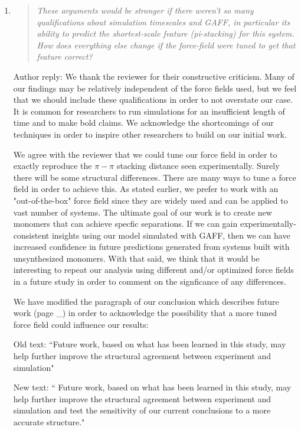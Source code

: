 \documentclass{article}
\begin{document}
\begin{enumerate}
    \item \begin{quote}
    \textit{These arguments would be stronger if there weren't so many
	    qualifications about simulation timescales and GAFF, in particular its ability
	    to predict the shortest-scale feature (pi-stacking) for this system. How does
	    everything else change if the force-field were tuned to get that feature
	    correct?}
    \end{quote}

    Author reply: We thank the reviewer for their constructive criticism. Many
    of our findings may be relatively independent of the force fields used, but we
    feel that we should include these qualifications in order to not overstate our
    case. It is common for researchers to run simulations for an insufficient
    length of time and to make bold claims. We acknowledge the shortcomings of our
    techniques in order to inspire other researchers to build on our initial work. 

    We agree with the reviewer that we could tune our force field in order to
    exactly reproduce the $\pi-\pi$ stacking distance seen experimentally. Surely
    there will be some structural differences. There are many ways to tune a force
    field in order to achieve this. As stated earlier, we prefer to work with an
    "out-of-the-box" force field since they are widely used and can be applied to
    vast number of systems. The ultimate goal of our work is to create new monomers
    that can achieve specfic separations. If we can gain experimentally-consistent
    insights using our model simulated with GAFF, then we can have increased
    confidence in future predictions generated from systems built with
    unsynthesized monomers.  With that said, we think that it would be interesting
    to repeat our analysis using different and/or optimized force fields in a
    future study in order to comment on the signficance of any differences.

    We have modified the paragraph of our conclusion which describes future
    work (page \_) in order to acknowledge the possibility that a more tuned force
    field could influence our results:

    Old text: ``Future work, based on what has been learned in this study, may
    help further improve the structural agreement between experiment and
    simulation"

    New text: ``  Future work, based on what has been learned in this study,
    may help further improve the structural agreement between experiment and
    simulation and test the sensitivity of our current conclusions to a more
    accurate structure." 


\end{enumerate}
\end{document}
